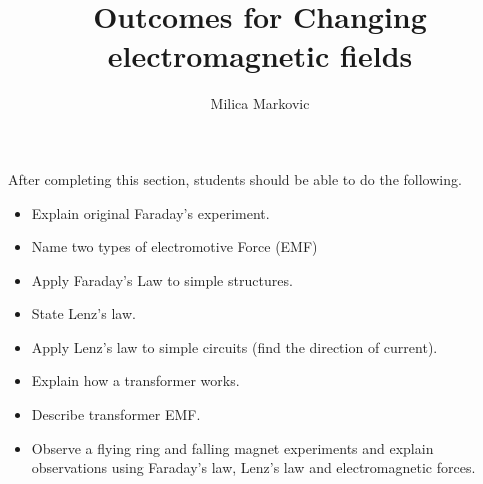 \documentclass{ximera}
\title{Outcomes for Changing electromagnetic fields}
\author{Milica Markovic}
\begin{document}
\begin{abstract}
\end{abstract}

\maketitle

\begin{sectionOutcomes}

After completing this section, students should be able to do the following.

\begin{itemize}
\item Explain original Faraday's experiment.
\item Name two types of electromotive Force (EMF)
\item Apply Faraday's Law to simple structures.
\item State Lenz's law.
\item Apply Lenz's law to simple circuits (find the direction of current).
\item Explain how a transformer works.
\item Describe transformer EMF.
\item Observe a flying ring and falling magnet experiments and explain observations using Faraday's law, Lenz's law and electromagnetic forces.
\end{itemize}

\end{sectionOutcomes}
\end{document}
